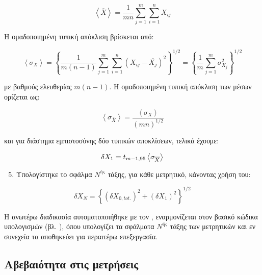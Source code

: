 \begin{equation*}
\left\langle\overline{X}\right\rangle = \displaystyle\frac{1}{mn}\sum_{j=1}^{m}\sum_{i=1}^{n} X_{ij}
\end{equation*}

\noindent Η ομαδοποιημένη τυπική απόκλιση βρίσκεται από:

\begin{equation*}
\left\langle\sigma _X\right\rangle = \left\{\displaystyle\frac{1}{m\left(n - 1\right)}\sum_{j=1}^{m}\sum_{i=1}^{n} \left(X_{ij} - \overline{X_j}\right) ^ 2\right\} ^ {1/2} = \left\{\displaystyle\frac{1}{m}\sum_{j=1}^{m} \sigma _{X_j}^2 \right\} ^{1/2}
\end{equation*}

\noindent με βαθμούς ελευθερίας $m(n - 1)$. Η ομαδοποιημένη τυπική απόκλιση των μέσων ορίζεται ως: 

\begin{equation*}
\left\langle\sigma_{\overline{X}}\right\rangle = \displaystyle\frac{\left\langle\sigma _X\right\rangle}{\left( mn\right) ^ {1/2}}
\end{equation*}

\noindent και για διάστημα εμπιστοσύνης δύο τυπικών αποκλίσεων, τελικά έχουμε:

\begin{equation*}
\delta X_1 = t_{\scriptsize{m-1,95}}\left\langle\sigma_{\overline{X}}\right\rangle
\end{equation*}


\begin{enumerate}\setcounter{enumi}{4}
\item Υπολογίστηκε το σφάλμα $N^{\text{ής}}$ τάξης, για κάθε μετρητικό, κάνοντας χρήση του:
\end{enumerate}

\begin{equation}\label{eq:nthunc}
\delta X_N = \left\{\left(\delta X_{0, tot.}\right) ^ 2 +  \left(\delta X_1\right) ^ 2 \right\} ^ {1/2}
\end{equation}

\noindent Η ανωτέρω διαδικασία αυτοματοποιήθηκε με τον , εναρμονίζεται στον βασικό κώδικα υπολογισμών (βλ. ), όπου υπολογίζει τα σφάλματα $N^{\text{ής}}$ τάξης των μετρητικών και εν συνεχεία τα αποθηκεύει για περαιτέρω επεξεργασία.

\subsection{Αβεβαιότητα στις μετρήσεις}

